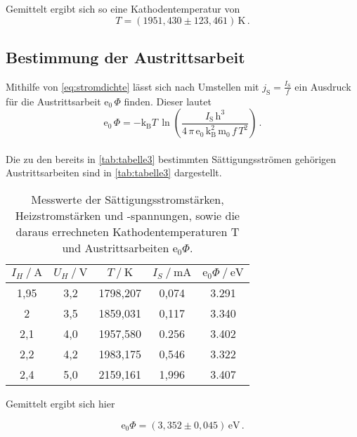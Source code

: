 Gemittelt ergibt sich so eine Kathodentemperatur von
\begin{equation*}
    T = (1951,430 \pm 123,461) \,\unit{\kelvin} \,.
\end{equation*}


\subsection{Bestimmung der Austrittsarbeit}

Mithilfe von \eqref{eq:stromdichte} lässt sich nach Umstellen mit $j_\text{S} = \frac{I_\text{S}}{f}$ ein Ausdruck für die Austrittsarbeit $\text{e}_0 \,\Phi$ finden.
Dieser lautet
\begin{equation*}
    \text{e}_0 \,\Phi = -\text{k}_\text{B} T \,\ln \left(\dfrac{I_\text{S} \, \text{h}^3}{4 \, \pi \, \text{e}_0 \, \text{k}^2_\text{B} \, \text{m}_0 \,f \,  T^2}\right) \,.
\end{equation*} \\

Die zu den bereits in \autoref{tab:tabelle3} bestimmten Sättigungsströmen gehörigen Austrittsarbeiten sind in \autoref{tab:tabelle3} dargestellt.

%
%
%
%

\begin{table}[H]
    \centering
    \caption{Messwerte der Sättigungsstromstärken, Heizstromstärken und -spannungen, sowie die daraus errechneten Kathodentemperaturen T und Austrittsarbeiten $\text{e}_0\Phi$.}
    \label{tab:tabelle3}
    \begin{tabular}{S[table-format=1.2] S S S S}
        \toprule
        {$I_{H} \mathbin{/} \unit{\ampere}$} & {$U_{H} \mathbin{/} \unit{\volt}$} & {$T \mathbin{/} \unit{\kelvin}$} & {$I_{S} \mathbin{/} \unit{\milli\ampere}$} & {$\text{e}_0\Phi \mathbin{/} \unit{\eV}$} \\
        ,95&3,2&1798,207&0,074&3.291\\
        2   &3,5&1859,031&0,117&3.340\\
        2,1 &4,0&1957,580&0.256&3.402\\
        2,2 &4,2&1983,175&0,546&3.322\\
        2,4 &5,0&2159,161&1,996&3.407\\
        \bottomrule
    \end{tabular}
\end{table}



Gemittelt ergibt sich hier

\begin{equation*}
    \text{e}_0 \Phi = (3,352 \pm 0,045) \,\unit{\eV} \,.
\end{equation*}